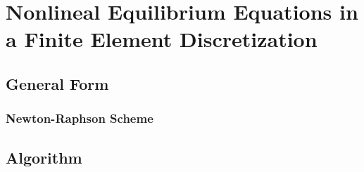 %
\chapter{Nonlineal Equilibrium Equations in a Finite Element Discretization}

\section{General Form}


\subsection{Newton-Raphson Scheme}


\section{Algorithm}
